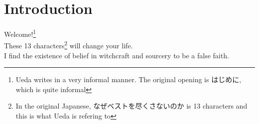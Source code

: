 
\chapter{Introduction}
Welcome!\footnote{Ueda writes in a very informal manner. The original opening is はじめに, which is quite informal}
\\These 13 characters\footnote {In the original Japanese, なぜベストを尽くさないのか is 13 characters and this is what Ueda is refering to} will change your life.
\\I find the existence of belief in witchcraft and sourcery to be a false faith.